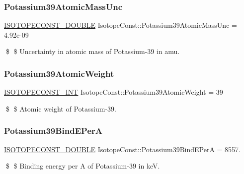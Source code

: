 \subsubsection{\texorpdfstring{Potassium39\+Atomic\+Mass\+Unc}{Potassium39AtomicMassUnc}}
{\footnotesize\ttfamily \mbox{\hyperlink{group___isotope_const-_macros_ga8f45a7272ce02c0b4c65c44636ed719a}{I\+S\+O\+T\+O\+P\+E\+C\+O\+N\+S\+T\+\_\+\+D\+O\+U\+B\+LE}} Isotope\+Const\+::\+Potassium39\+Atomic\+Mass\+Unc = 4.\+92e-\/09}

\$ \$ Uncertainty in atomic mass of Potassium-\/39 in amu. \mbox{\label{group___isotope_const-_potassium-_k39_gae6f3fbcda392a8e8db0a5d4d86795608}} 
\subsubsection{\texorpdfstring{Potassium39\+Atomic\+Weight}{Potassium39AtomicWeight}}
{\footnotesize\ttfamily \mbox{\hyperlink{group___isotope_const-_macros_ga5f18360b3e99483a35c32d789e62621c}{I\+S\+O\+T\+O\+P\+E\+C\+O\+N\+S\+T\+\_\+\+I\+NT}} Isotope\+Const\+::\+Potassium39\+Atomic\+Weight = 39}

\$ \$ Atomic weight of Potassium-\/39. \mbox{\label{group___isotope_const-_potassium-_k39_ga85414a1a7b79c505918af929379f300c}} 
\subsubsection{\texorpdfstring{Potassium39\+Bind\+E\+PerA}{Potassium39BindEPerA}}
{\footnotesize\ttfamily \mbox{\hyperlink{group___isotope_const-_macros_ga8f45a7272ce02c0b4c65c44636ed719a}{I\+S\+O\+T\+O\+P\+E\+C\+O\+N\+S\+T\+\_\+\+D\+O\+U\+B\+LE}} Isotope\+Const\+::\+Potassium39\+Bind\+E\+PerA = 8557.}

\$ \$ Binding energy per A of Potassium-\/39 in keV. \mbox{\label{group___isotope_const-_potassium-_k39_ga19e4172465c3b8125b0e0e6d66a6ebb9}} 
